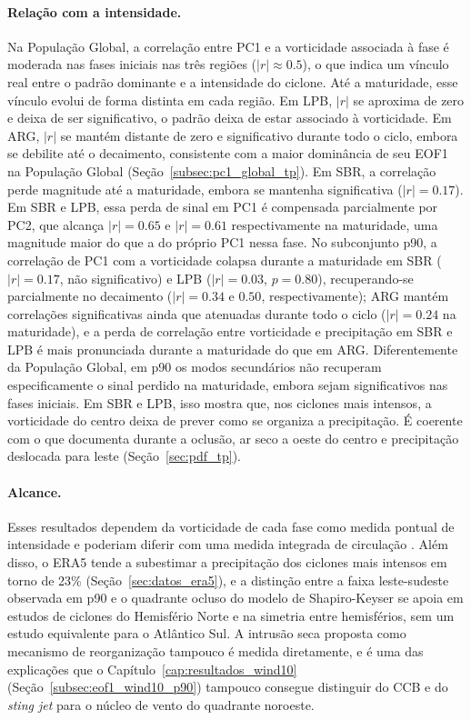 \paragraph{Relação com a intensidade.}
Na População Global, a correlação entre PC1 e a vorticidade associada à fase é moderada nas fases iniciais nas três regiões ($|r|\approx0.5$), o que indica um vínculo real entre o padrão dominante e a intensidade do ciclone. Até a maturidade, esse vínculo evolui de forma distinta em cada região. Em LPB, $|r|$ se aproxima de zero e deixa de ser significativo, o padrão deixa de estar associado à vorticidade. Em ARG, $|r|$ se mantém distante de zero e significativo durante todo o ciclo, embora se debilite até o decaimento, consistente com a maior dominância de seu EOF1 na População Global (Seção~\ref{subsec:pc1_global_tp}). Em SBR, a correlação perde magnitude até a maturidade, embora se mantenha significativa ($|r|=0.17$). Em SBR e LPB, essa perda de sinal em PC1 é compensada parcialmente por PC2, que alcança $|r|=0.65$ e $|r|=0.61$ respectivamente na maturidade, uma magnitude maior do que a do próprio PC1 nessa fase. No subconjunto p90, a correlação de PC1 com a vorticidade colapsa durante a maturidade em SBR ($|r|=0.17$, não significativo) e LPB ($|r|=0.03$, $p = 0.80$), recuperando-se parcialmente no decaimento ($|r|=0.34$ e $0.50$, respectivamente); ARG mantém correlações significativas ainda que atenuadas durante todo o ciclo ($|r|=0.24$ na maturidade), e a perda de correlação entre vorticidade e precipitação em SBR e LPB é mais pronunciada durante a maturidade do que em ARG. Diferentemente da População Global, em p90 os modos secundários não recuperam especificamente o sinal perdido na maturidade, embora sejam significativos nas fases iniciais. Em SBR e LPB, isso mostra que, nos ciclones mais intensos, a vorticidade do centro deixa de prever como se organiza a precipitação. É coerente com o que documenta \citet{shapiro1999bridge} durante a oclusão, ar seco a oeste do centro e precipitação deslocada para leste (Seção~\ref{sec:pdf_tp}).

\paragraph{Alcance.}
Esses resultados dependem da vorticidade de cada fase como medida pontual de intensidade e poderiam diferir com uma medida integrada de circulação \citep{sinclair1997objective}. Além disso, o ERA5 tende a subestimar a precipitação dos ciclones mais intensos em torno de 23\% \citep{chen2024evaluation} (Seção~\ref{sec:datos_era5}), e a distinção entre a faixa leste-sudeste observada em p90 e o quadrante ocluso do modelo de Shapiro-Keyser se apoia em estudos de ciclones do Hemisfério Norte \citep{martin1999forcing, sawada2021heavy} e na simetria entre hemisférios, sem um estudo equivalente para o Atlântico Sul. A intrusão seca proposta como mecanismo de reorganização tampouco é medida diretamente, e é uma das explicações que o Capítulo~\ref{cap:resultados_wind10} (Seção~\ref{subsec:eof1_wind10_p90}) tampouco consegue distinguir do CCB e do \textit{sting jet} para o núcleo de vento do quadrante noroeste.

